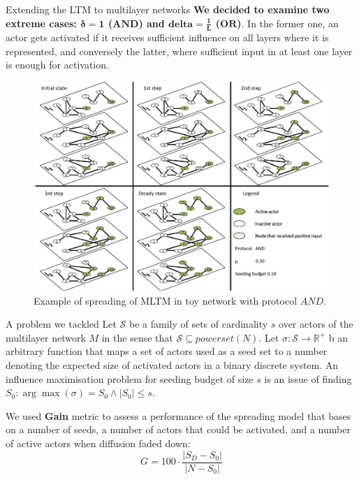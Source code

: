 \documentclass[final]{beamer}
\newlength{\colwidth}
\begin{document}
\begin{frame}[t, fragile]
\begin{columns}[t]
\begin{column}{\colwidth}
\begin{alertblock}{Extending the LTM to multilayer networks}
    \textbf{We decided to examine two extreme cases: $\mathbf{\delta = 1}$ ($\mathbf{AND}$) and $\mathbf{delta = \frac{1}{L}}$ ($\mathbf{OR}$)}. In the former one, an actor gets activated if it receives sufficient influence on all layers where it is represented, and conversely the latter, where sufficient input in at least one layer is enough for activation.
    \begin{figure}
        \centering
        \includegraphics[width=1\linewidth]{figures/ltm_example.pdf}
        \caption{Example of spreading of MLTM in toy network with protocol $AND$.}
        \label{fig:ltm_example_and}
    \end{figure}
\end{alertblock}

\begin{block}{A problem we tackled}
    Let $\mathcal{S}$ be a family of sets of cardinality $s$ over actors of
    the multilayer network $M$ in the sense that $\mathcal{S} \subseteq
    powerset(N)$. Let $\sigma: \mathcal{S} \rightarrow \mathbb{R^{+}}$ b
    an arbitrary function that maps a set of actors used as a seed set to
    a number denoting the expected size of activated actors in a binary discrete system. An influence maximisation problem for seeding budget of size $s$ is an issue of finding $ S_{0}: \arg\max(\sigma) = S_{0} \wedge |S_{0}| \leq s$.
    
    We used \textbf{Gain} metric to assess a performance of the spreading model that bases on a number of seeds, a number of actors that could be activated, and a number of active actors when diffusion faded down:
    \begin{equation*}
        G = 100 \cdot \frac{|S_{D} - S_{0}|}{|N - S_{0}|}
    \end{equation*}
\end{block}


\end{column}
\end{columns}
\end{frame}
\end{document}

